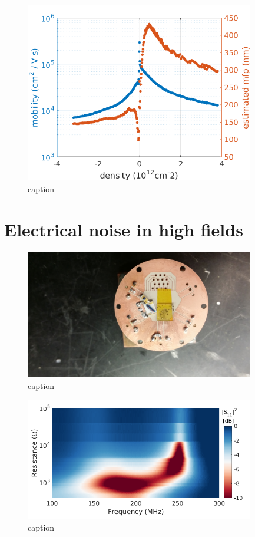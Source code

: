 \begin{figure}
\centering
\includegraphics[width=100mm]{figures/magneto/mobility_mfp_1K.png}
\caption{caption}
\label{fig:m_mobility}
\end{figure}

\section{Electrical noise in high fields}

\begin{figure}
\centering
\includegraphics[width=100mm]{figures/magneto/picture_matching_ceramic.jpg}
\caption{caption}
\label{fig:m_matching}
\end{figure}

\begin{figure}
\centering
\includegraphics[width=100mm]{figures/magneto/S11_plot.png}
\caption{caption}
\label{fig:m_S11}
\end{figure}

